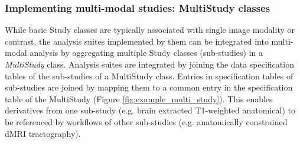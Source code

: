 \documentclass[smallextended]{svjour3}       %
\begin{document}
\subsubsection*{Implementing multi-modal studies: MultiStudy classes}
\label{implementing-multi-modal-studies}

While basic Study classes are typically associated with single image
modality or contrast, the analysis suites implemented by them can be
integrated into multi-modal analysis by aggregating multiple Study
classes (sub-studies) in a \emph{MultiStudy} class. Analysis suites are
integrated by joining the data specification tables of the sub-studies
of a MultiStudy class. Entries in specification tables of sub-studies
are joined by mapping them to a common entry in the specification table
of the MultiStudy (Figure \ref{fig:example_multi_study}). This enables derivatives from one
sub-study (e.g. brain extracted T1-weighted anatomical) to be referenced
by workflows of other sub-studies (e.g. anatomically constrained dMRI
tractography).
\end{document}
